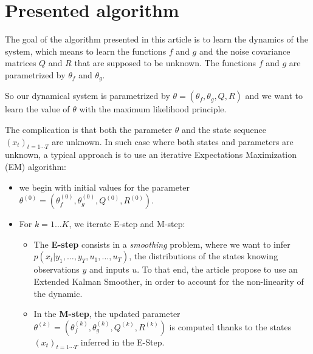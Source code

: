 \section{Presented algorithm}

The goal of the algorithm presented in this article is to learn the dynamics of the system, which means to learn the functions $f$ and $g$  and the noise covariance matrices $Q$ and $R$ that are supposed to be unknown.
The functions $f$ and $g$ are parametrized by $\theta_f$ and $\theta_g$.

So our dynamical system is parametrized by $\theta = \left(\theta_f, \theta_g, Q, R \right)$ and we want to learn the value of $\theta$ with the maximum likelihood principle.

The complication is that both the parameter $\theta$ and the state sequence $(x_t)_{t=1 \cdots T}$ are unknown.
In such case where both states and parameters are unknown, a typical approach is to use an iterative Expectations Maximization (EM) algorithm:
\begin{itemize}
  \item we begin with initial values for the parameter $\theta^{(0)} = \left( \theta_f^{(0)}, \theta_g^{(0)}, Q^{(0)}, R^{(0)} \right)$.
\item For $k=1 \ldots K$, we iterate E-step and M-step:
  \begin{itemize}
    \item The \textbf{E-step} consists in a \textit{smoothing} problem, where we want to infer \\ $p(x_t | y_1,\ldots,y_T, u_1,\ldots,u_T)$, the distributions of the states knowing observations $y$ and inputs $u$.
      To that end, the article propose to use an Extended Kalman Smoother, in order to account for the non-linearity of the dynamic.
    \item In the \textbf{M-step}, the updated parameter $\theta^{(k)} = \left( \theta_f^{(k)}, \theta_g^{(k)}, Q^{(k)}, R^{(k)} \right)$ is computed thanks to the states $(x_t)_{t=1 \cdots T}$ inferred in the E-Step.
  \end{itemize}
\end{itemize}
